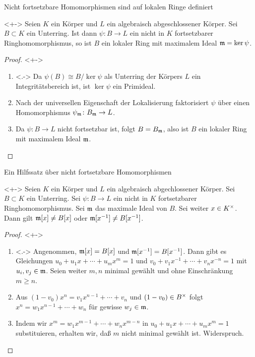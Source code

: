 \begin{frame}{Nicht fortsetzbare Homomorphismen sind auf lokalen Ringe definiert}
	\begin{lemma}<+->
		Seien \(K\) ein Körper und \(L\) ein algebraisch abgeschlossener Körper. Sei \(B
		\subset K\) ein	Unterring. Ist dann \(\psi\colon B \to L\) ein nicht
		in \(K\) fortsetzbarer Ringhomomorphismus, so ist \(B\) ein lokaler Ring mit
		maximalem Ideal \(\mathfrak{m} = \ker \psi\).
	\end{lemma}
	\begin{proof}<+->
		\begin{enumerate}[<+->]
		\item<.->
			Da \(\psi(B) \cong B/\ker \psi\) als Unterring der Körpers \(L\) ein
			Integritätsbereich ist, ist \(\ker \psi\) ein Primideal.
		\item
			Nach der universellen Eigenschaft der Lokalisierung faktorisiert
			\(\psi\) über einen Homomorphismus \(\psi_{\mathfrak{m}}\colon
			B_{\mathfrak{m}} \to L\).
		\item
			Da \(\psi\colon B \to L\) nicht fortsetzbar ist, folgt
			\(B = B_{\mathfrak{m}}\), also ist \(B\) ein lokaler Ring mit maximalem
			Ideal \(\mathfrak{m}\).
			\qedhere
		\end{enumerate}
	\end{proof}
\end{frame}

\begin{frame}{Ein Hilfssatz über nicht fortsetzbare Homomorphismen}
	\begin{lemma}<+->
		Seien \(K\) ein Körper und \(L\) ein algebraisch abgechlossener
		Körper. Sei \(B \subset K\) ein Unterring.
		Sei \(\psi\colon B \to L\) ein nicht in \(K\) fortsetzbarer Ringhomomorphismus.
		Sei \(\mathfrak{m}\) das maximale Ideal von \(B\). Sei weiter
		\(x \in K^\times\). Dann gilt
		\(\mathfrak{m}[x] \neq B[x]\) oder \(\mathfrak{m}[x^{-1}] \neq B[x^{-1}]\).
	\end{lemma}
	\begin{proof}<+->
		\begin{enumerate}[<+->]
		\item<.->
			Angenommen, \(\mathfrak{m}[x] = B[x]\) und \(\mathfrak{m}[x^{-1}]
			= B[x^{-1}]\). Dann gibt es Gleichungen
			\(u_0 + u_1 x + \dotsb + u_m x^m = 1\) und
			\(v_0 + v_1 x^{-1} + \dotsb + v_n x^{-n} = 1\) mit \(u_i, v_j \in
			\mathfrak{m}\). Seien weiter \(m, n\) minimal gewählt und ohne
			Einschränkung \(m \ge n\).
		\item
			Aus \((1 - v_0) x^n = v_1 x^{n - 1} + \dotsb + v_n\) und
			\((1 - v_0) \in B^\times\) folgt
			\(x^n = w_1 x^{n - 1} + \dotsb + w_n\)
			für gewisse \(w_j \in \mathfrak{m}\).
		\item
			Indem wir \(x^m = w_1 x^{m - 1} + \dotsb + w_n x^{m - n}\) in
			\(u_0 + u_1 x + \dotsb + u_m x^m = 1\) substituieren, erhalten wir,
			daß \(m\) nicht minimal gewählt ist. Widerspruch.
			\qedhere
		\end{enumerate}
	\end{proof}
\end{frame}

